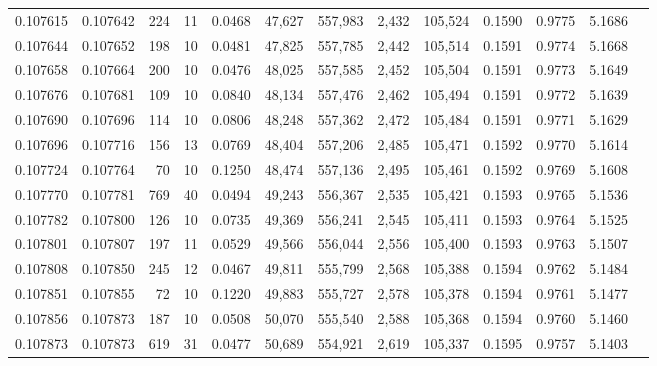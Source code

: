 \begin{tabular}{rrrrrrrrrrrrr}
0.107615 & 0.107642 &   224 &  11 &                                     0.0468 &  47,627 & 557,983 &   2,432 & 105,524 & 0.1590 & 0.9775 & 5.1686 \\
0.107644 & 0.107652 &   198 &  10 &                                     0.0481 &  47,825 & 557,785 &   2,442 & 105,514 & 0.1591 & 0.9774 & 5.1668 \\
0.107658 & 0.107664 &   200 &  10 &                                     0.0476 &  48,025 & 557,585 &   2,452 & 105,504 & 0.1591 & 0.9773 & 5.1649 \\
0.107676 & 0.107681 &   109 &  10 &                                     0.0840 &  48,134 & 557,476 &   2,462 & 105,494 & 0.1591 & 0.9772 & 5.1639 \\
0.107690 & 0.107696 &   114 &  10 &                                     0.0806 &  48,248 & 557,362 &   2,472 & 105,484 & 0.1591 & 0.9771 & 5.1629 \\
0.107696 & 0.107716 &   156 &  13 &                                     0.0769 &  48,404 & 557,206 &   2,485 & 105,471 & 0.1592 & 0.9770 & 5.1614 \\
0.107724 & 0.107764 &    70 &  10 &                                     0.1250 &  48,474 & 557,136 &   2,495 & 105,461 & 0.1592 & 0.9769 & 5.1608 \\
0.107770 & 0.107781 &   769 &  40 &                                     0.0494 &  49,243 & 556,367 &   2,535 & 105,421 & 0.1593 & 0.9765 & 5.1536 \\
0.107782 & 0.107800 &   126 &  10 &                                     0.0735 &  49,369 & 556,241 &   2,545 & 105,411 & 0.1593 & 0.9764 & 5.1525 \\
0.107801 & 0.107807 &   197 &  11 &                                     0.0529 &  49,566 & 556,044 &   2,556 & 105,400 & 0.1593 & 0.9763 & 5.1507 \\
0.107808 & 0.107850 &   245 &  12 &                                     0.0467 &  49,811 & 555,799 &   2,568 & 105,388 & 0.1594 & 0.9762 & 5.1484 \\
0.107851 & 0.107855 &    72 &  10 &                                     0.1220 &  49,883 & 555,727 &   2,578 & 105,378 & 0.1594 & 0.9761 & 5.1477 \\
0.107856 & 0.107873 &   187 &  10 &                                     0.0508 &  50,070 & 555,540 &   2,588 & 105,368 & 0.1594 & 0.9760 & 5.1460 \\
0.107873 & 0.107873 &   619 &  31 &                                     0.0477 &  50,689 & 554,921 &   2,619 & 105,337 & 0.1595 & 0.9757 & 5.1403 \\

\end{tabular}
